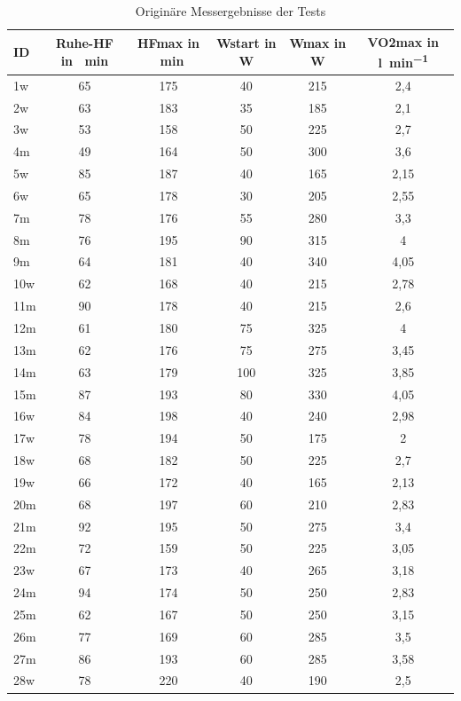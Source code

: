 \begin{table}[H]
	\centering
		\caption{Originäre Messergebnisse der Tests}
		\medskip
		\begin{tabulary}{\textwidth}{L C C C C C}
			\toprule
			ID & Ruhe-\gls{HF} in \si{\per\minute} & \gls{HFmax} in \si{\per\minute} & \gls{Wstart} in \si{\watt} & \gls{Wmax} in \si{\watt} & \gls{VO2max} in \si{\litre\per\minute} \\
			\midrule
			\midrule
			1w & 65 & 175 & 40 & 215 & 2,4 \\
			2w & 63 & 183 & 35 & 185 & 2,1 \\
			3w & 53 & 158 & 50 & 225 & 2,7 \\
			4m & 49 & 164 & 50 & 300 & 3,6 \\
			5w & 85 & 187 & 40 & 165 & 2,15 \\
			6w & 65 & 178 & 30 & 205 & 2,55 \\
			7m & 78 & 176 & 55 & 280 & 3,3 \\
			8m & 76 & 195 & 90 & 315 & 4 \\
			9m & 64 & 181 & 40 & 340 & 4,05 \\
			10w & 62 & 168 & 40 & 215 & 2,78 \\
			11m & 90 & 178 & 40 & 215 & 2,6 \\
			12m & 61 & 180 & 75 & 325 & 4 \\
			13m & 62 & 176 & 75 & 275 & 3,45 \\
			14m & 63 & 179 & 100 & 325 & 3,85 \\
			15m & 87 & 193 & 80 & 330 & 4,05 \\
			16w & 84 & 198 & 40 & 240 & 2,98 \\
			17w & 78 & 194 & 50 & 175 & 2 \\
			18w & 68 & 182 & 50 & 225 & 2,7 \\
			19w & 66 & 172 & 40 & 165 & 2,13 \\
			20m & 68 & 197 & 60 & 210 & 2,83 \\
			21m & 92 & 195 & 50 & 275 & 3,4 \\
			22m & 72 & 159 & 50 & 225 & 3,05 \\
			23w & 67 & 173 & 40 & 265 & 3,18 \\
			24m & 94 & 174 & 50 & 250 & 2,83 \\
			25m & 62 & 167 & 50 & 250 & 3,15 \\
			26m & 77 & 169 & 60 & 285 & 3,5 \\
			27m & 86 & 193 & 60 & 285 & 3,58 \\
			28w & 78 & 220 & 40 & 190 & 2,5 \\
			\bottomrule
		\end{tabulary}
		\label{tab:tabelle4}
\end{table}
%
